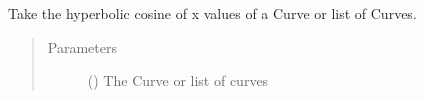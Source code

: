 \documentclass[letterpaper,10pt,english]{sphinxmanual}
\begin{document}
\begin{fulllineitems}
\label{\detokenize{pydv:pydvpy.coshx}}
Take the hyperbolic cosine of x values of a Curve or list of Curves.

\begin{sphinxVerbatim}[commandchars=\\\{\}]
  
\end{sphinxVerbatim}

\begin{sphinxVerbatim}[commandchars=\\\{\}]
 
\end{sphinxVerbatim}

\begin{sphinxVerbatim}[commandchars=\\\{\}]
\PYG{p}{[}\PYG{p}{]}
\end{sphinxVerbatim}
\begin{quote}\begin{description}
\item[{Parameters}] \leavevmode
{} ({\hyperref[\detokenize{pydv:curve.Curve}]{}}) \textendash{} The Curve or list of curves

\end{description}\end{quote}

\end{fulllineitems}

\end{document}
